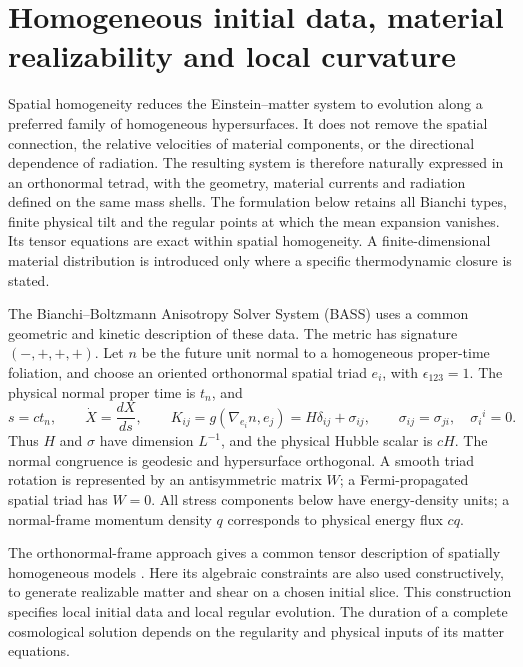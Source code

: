 \chapter{Homogeneous initial data, material realizability and local curvature}
\label{sec:homogeneous_geometry}

Spatial homogeneity reduces the Einstein--matter system to evolution along a preferred family of homogeneous hypersurfaces. It does not remove the spatial connection, the relative velocities of material components, or the directional dependence of radiation. The resulting system is therefore naturally expressed in an orthonormal tetrad, with the geometry, material currents and radiation defined on the same mass shells. The formulation below retains all Bianchi types, finite physical tilt and the regular points at which the mean expansion vanishes. Its tensor equations are exact within spatial homogeneity. A finite-dimensional material distribution is introduced only where a specific thermodynamic closure is stated.

The Bianchi--Boltzmann Anisotropy Solver System (BASS) uses a common geometric and kinetic description of these data. The metric has signature $(-,+,+,+)$. Let $n$ be the future unit normal to a homogeneous proper-time foliation, and choose an oriented orthonormal spatial triad $e_i$, with $\epsilon_{123}=1$. The physical normal proper time is $t_n$, and
\begin{equation}
 s=ct_n,\qquad \dot X=\frac{dX}{ds},\qquad
 K_{ij}=g(\nabla_{e_i}n,e_j)=H\delta_{ij}+\sigma_{ij},
 \qquad \sigma_{ij}=\sigma_{ji},\quad \sigma_i{}^i=0.
 \label{geo:clock}
\end{equation}
Thus $H$ and $\sigma$ have dimension $L^{-1}$, and the physical Hubble scalar is $cH$. The normal congruence is geodesic and hypersurface orthogonal. A smooth triad rotation is represented by an antisymmetric matrix $W$; a Fermi-propagated spatial triad has $W=0$. All stress components below have energy-density units; a normal-frame momentum density $q$ corresponds to physical energy flux $cq$.

The orthonormal-frame approach gives a common tensor description of spatially homogeneous models \cite{vanElst1997}. Here its algebraic constraints are also used constructively, to generate realizable matter and shear on a chosen initial slice. This construction specifies local initial data and local regular evolution. The duration of a complete cosmological solution depends on the regularity and physical inputs of its matter equations.


